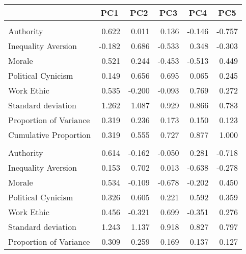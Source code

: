 
\begin{tabular}{lrrrrr}
\toprule
  & \multicolumn{1}{c}{PC1} & \multicolumn{1}{c}{PC2} & \multicolumn{1}{c}{PC3} & \multicolumn{1}{c}{PC4} & \multicolumn{1}{c}{PC5}\\
\midrule
\addlinespace[0.3em]
\multicolumn{6}{l}{\textbf{Age 26}}\\
\hline
\hspace{1em}Authority & 0.622 & 0.011 & 0.136 & -0.146 & -0.757\\
\hspace{1em}Inequality Aversion & -0.182 & 0.686 & -0.533 & 0.348 & -0.303\\
\hspace{1em}Morale & 0.521 & 0.244 & -0.453 & -0.513 & 0.449\\
\hspace{1em}Political Cynicism & 0.149 & 0.656 & 0.695 & 0.065 & 0.245\\
\hspace{1em}Work Ethic & 0.535 & -0.200 & -0.093 & 0.769 & 0.272\\
\midrule
\hspace{1em}Standard deviation & 1.262 & 1.087 & 0.929 & 0.866 & 0.783\\
\hspace{1em}Proportion of Variance & 0.319 & 0.236 & 0.173 & 0.150 & 0.123\\
\hspace{1em}Cumulative Proportion & 0.319 & 0.555 & 0.727 & 0.877 & 1.000\\
\addlinespace[0.3em]
\multicolumn{6}{l}{\textbf{Age 30}}\\
\hline
\hspace{1em}Authority & 0.614 & -0.162 & -0.050 & 0.281 & -0.718\\
\hspace{1em}Inequality Aversion & 0.153 & 0.702 & 0.013 & -0.638 & -0.278\\
\hspace{1em}Morale & 0.534 & -0.109 & -0.678 & -0.202 & 0.450\\
\hspace{1em}Political Cynicism & 0.326 & 0.605 & 0.221 & 0.592 & 0.359\\
\hspace{1em}Work Ethic & 0.456 & -0.321 & 0.699 & -0.351 & 0.276\\
\midrule
\hspace{1em}Standard deviation & 1.243 & 1.137 & 0.918 & 0.827 & 0.797\\
\hspace{1em}Proportion of Variance & 0.309 & 0.259 & 0.169 & 0.137 & 0.127\\

\end{tabular}

